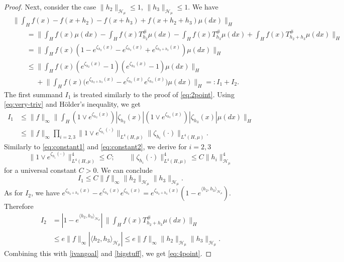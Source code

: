 \documentclass[11pt,a4paper]{article}
\renewcommand{\H}{\mathcal{H}}
\renewcommand{\le}{\leqslant}
\newcommand{\CM}{\H_\mu}
\newcommand{\nn}{\nonumber}
\numberwithin{equation}{section}
\theoremstyle{definition}
\theoremstyle{remark}
\theoremstyle{plain}
\begin{document}
\begin{proof}
Next, consider the case $\|h_2\|_{\CM}\le1$, $\|h_3\|_{\CM} \leqslant 1$. 
We have
\begin{align}\label{bigstuff}
&\Big\|\int_H f(x)-f(x+h_2)-f(x+h_3)+f(x+h_2+h_3) \mu(dx)\Big\|_{H}\nn\\
&\qquad=\Big\|\int_H f(x)\mu(dx) -\int_H f(x)T_{h_2}^\#\mu(dx) -\int_H f(x)T_{h_3}^\#\mu(dx) +\int_H f(x)T_{h_2+h_3}^\#\mu(dx) \Big\|_{H}\nn\\
&\qquad= \Big\|\int_H f(x)(1-e^{\zeta_{h_2}(x)}-e^{\zeta_{h_3}(x)}+e^{\zeta_{h_2+h_3}(x)})\mu(dx)\Big\|_{H}\nn\\
&\qquad\leqslant \Big\|\int_H f(x)(e^{\zeta_{h_2}(x)}-1)(e^{\zeta_{h_3}(x)}-1)\mu(dx)\Big\|_{H}\nn\\
&\qquad{\phantom{\le}} +\Big\|\int_H f(x)\Big(e^{\zeta_{h_2+h_3}(x)}-e^{\zeta_{h_2}(x)}e^{\zeta_{h_3}(x)}\Big) \mu(dx)\Big\|_{H}=:I_1+I_2.
\end{align}
The first summand $I_1$ is treated similarly to the proof of \eqref{eq:2point}. Using \eqref{eq:very-triv} and H\"older's inequality, we get 
\begin{align*}
I_1&\le \|f\|_\infty\Big\|\int_H  (1\vee e^{\zeta_{h_2}(x)}) |\zeta_{h_2}(x)|(1\vee e^{\zeta_{h_3}(x)}) |\zeta_{h_3}(x)| \mu(dx)\Big\|_{H}\\
&\le\|f\|_\infty \prod_{i=2,3} \|1\vee e^{\zeta_{h_i}(\cdot)}\|_{L^4(H,\mu)} \|\zeta_{h_i}(\cdot)\|_{L^4(H,\mu)}.
\end{align*}
Similarly to \eqref{eq:constant1} and \eqref{eq:constant2}, we derive for $i=2,3$
\begin{equation*}
\|1\vee e^{\zeta_{h_i}(\cdot)}\|_{L^4(H,\mu)}^4\le C;\qquad
\|\zeta_{h_i}(\cdot)\|_{L^4(H,\mu)}^4\le C \|h_i\|_{\CM}^4   
\end{equation*}
for a universal constant $C>0$. We can conclude
\begin{equation}\label{ivangoal}
    I_1\leqslant C\|f\|_\infty\|h_2\|_{\CM}\|h_3\|_{\CM}. 
\end{equation}
As for $I_2$, we have $e^{\zeta_{h_2+h_3}(x)}-e^{\zeta_{h_2}(x)}e^{\zeta_{h_3}(x)}=e^{\zeta_{h_2+h_3}(x)}(1-e^{\langle h_2,h_3\rangle_{\CM}})$. Therefore
\begin{align*}
I_2&=|1-e^{\langle h_2,h_3\rangle_{\CM}}|\,\Big\|\int_H f(x)T_{h_2+h_3}^\# \mu(dx)\Big\|_{H}\\
&\le  e\|f\|_\infty|\langle h_2,h_3\rangle_{\CM}|\leqslant e \|f\|_\infty \|h_2\|_{\CM} \|h_3\|_{\CM}.
\end{align*}
Combining this with \eqref{ivangoal} and \eqref{bigstuff}, we get 
\eqref{eq:4point}.
\end{proof}
\end{document}

